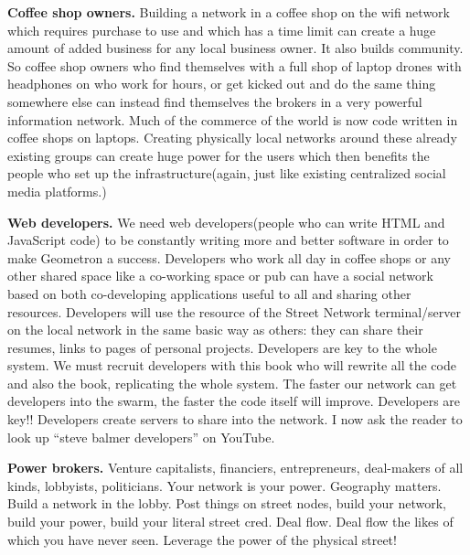 \documentclass{report}
\begin{document}
\textbf{Coffee shop owners.} Building a network in a coffee shop on the
wifi network which requires purchase to use and which has a time limit
can create a huge amount of added business for any local business owner.
It also builds community. So coffee shop owners who find themselves with
a full shop of laptop drones with headphones on who work for hours, or
get kicked out and do the same thing somewhere else can instead find
themselves the brokers in a very powerful information network. Much of
the commerce of the world is now code written in coffee shops on
laptops. Creating physically local networks around these already
existing groups can create huge power for the users which then benefits
the people who set up the infrastructure(again, just like existing
centralized social media platforms.)

\textbf{Web developers.} We need web developers(people who can write
HTML and JavaScript code) to be constantly writing more and better
software in order to make Geometron a success. Developers who work all
day in coffee shops or any other shared space like a co-working space or
pub can have a social network based on both co-developing applications
useful to all and sharing other resources. Developers will use the
resource of the Street Network terminal/server on the local network in
the same basic way as others: they can share their resumes, links to
pages of personal projects. Developers are key to the whole system. We
must recruit developers with this book who will rewrite all the code and
also the book, replicating the whole system. The faster our network can
get developers into the swarm, the faster the code itself will improve.
Developers are key!! Developers create servers to share into the
network. I now ask the reader to look up ``steve balmer developers'' on
YouTube.

\textbf{Power brokers.} Venture capitalists, financiers, entrepreneurs,
deal-makers of all kinds, lobbyists, politicians. Your network is your
power. Geography matters. Build a network in the lobby. Post things on
street nodes, build your network, build your power, build your literal
street cred. Deal flow. Deal flow the likes of which you have never
seen. Leverage the power of the physical street!
\end{document}
